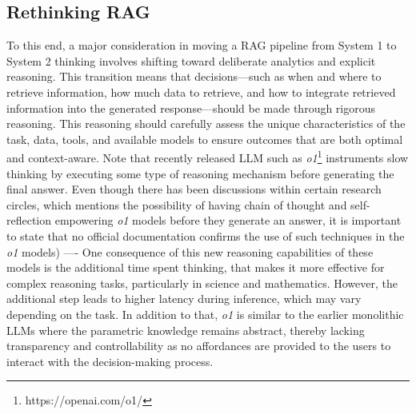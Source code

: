 
\subsection{Rethinking RAG}
To this end, a major consideration in moving a RAG pipeline from System 1 to System 2 thinking involves shifting toward deliberate analytics and explicit reasoning.
This transition means that decisions—such as when and where to retrieve information, how much data to retrieve, and how to integrate retrieved information into the generated response—should be made through rigorous reasoning. This reasoning should carefully assess the unique characteristics of the task, data, tools, and available models to ensure outcomes that are both optimal and context-aware. Note that recently released LLM such as \emph{o1}\footnote{https://openai.com/o1/} instruments slow thinking by executing some type of reasoning mechanism before generating the final answer. Even though there has been discussions within certain research circles, which mentions the possibility of having chain of thought and self-reflection empowering \emph{o1} models before they generate an answer, it is important to state that no official documentation confirms the use of such techniques in the \emph{o1} models) ---- One consequence of this new reasoning capabilities of these models is the additional time spent thinking, that makes it more effective for complex reasoning tasks, particularly in science and mathematics. 
However, the additional step leads to higher latency during inference, which may vary depending on the task. In addition to that, \emph{o1} is similar to the earlier monolithic LLMs where the parametric knowledge remains abstract, thereby lacking transparency and controllability as no affordances are provided to the users to interact with the decision-making process.

